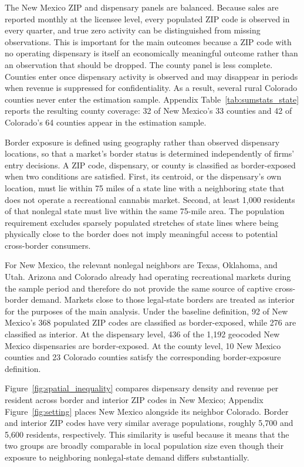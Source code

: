 \documentclass[12pt]{article}
\begin{document}
The New Mexico ZIP and dispensary panels are balanced. Because sales are reported monthly at the licensee level, every populated ZIP code is observed in every quarter, and true zero activity can be distinguished from missing observations. This is important for the main outcomes because a ZIP code with no operating dispensary is itself an economically meaningful outcome rather than an observation that should be dropped. The county panel is less complete. Counties enter once dispensary activity is observed and may disappear in periods when revenue is suppressed for confidentiality. As a result, several rural Colorado counties never enter the estimation sample. Appendix Table~\ref{tab:sumstats_state} reports the resulting county coverage: 32 of New Mexico's 33 counties and 42 of Colorado's 64 counties appear in the estimation sample.

Border exposure is defined using geography rather than observed dispensary locations, so that a market's border status is determined independently of firms' entry decisions. A ZIP code, dispensary, or county is classified as border-exposed when two conditions are satisfied. First, its centroid, or the dispensary's own location, must lie within 75 miles of a state line with a neighboring state that does not operate a recreational cannabis market. Second, at least 1,000 residents of that nonlegal state must live within the same 75-mile area. The population requirement excludes sparsely populated stretches of state lines where being physically close to the border does not imply meaningful access to potential cross-border consumers.

For New Mexico, the relevant nonlegal neighbors are Texas, Oklahoma, and Utah. Arizona and Colorado already had operating recreational markets during the sample period and therefore do not provide the same source of captive cross-border demand. Markets close to those legal-state borders are treated as interior for the purposes of the main analysis. Under the baseline definition, 92 of New Mexico's 368 populated ZIP codes are classified as border-exposed, while 276 are classified as interior. At the dispensary level, 436 of the 1,192 geocoded New Mexico dispensaries are border-exposed. At the county level, 10 New Mexico counties and 23 Colorado counties satisfy the corresponding border-exposure definition.

Figure~\ref{fig:spatial_inequality} compares dispensary density and revenue per resident across border and interior ZIP codes in New Mexico; Appendix Figure~\ref{fig:setting} places New Mexico alongside its neighbor Colorado. Border and interior ZIP codes have very similar average populations, roughly 5,700 and 5,600 residents, respectively. This similarity is useful because it means that the two groups are broadly comparable in local population size even though their exposure to neighboring nonlegal-state demand differs substantially.
\end{document}
